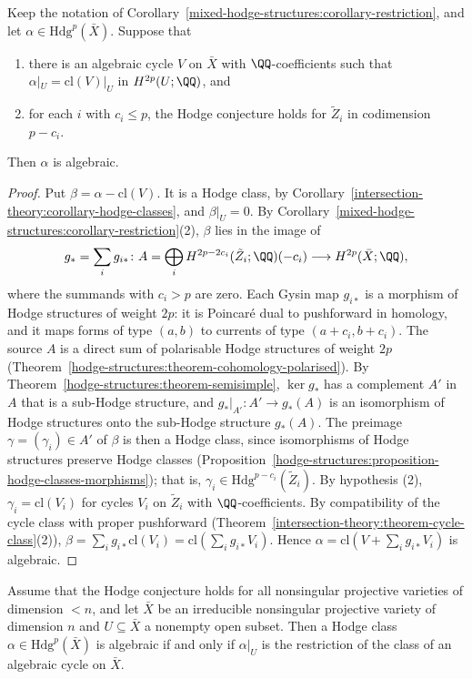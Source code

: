 \begin{proposition}\label{mixed-hodge-structures:proposition-localisation}
Keep the notation of Corollary~\ref{mixed-hodge-structures:corollary-restriction}, and let $\alpha \in \mathrm{Hdg}^p(\bar X)$. Suppose that
\begin{enumerate}
\item there is an algebraic cycle $V$ on $\bar X$ with $\QQ$-coefficients such that $\alpha|_U = \mathrm{cl}(V)|_U$ in $H^{2p}(U; \QQ)$, and
\item for each $i$ with $c_i \leq p$, the Hodge conjecture holds for $\tilde Z_i$ in codimension $p - c_i$.
\end{enumerate}
Then $\alpha$ is algebraic.
\end{proposition}

\begin{proof}
Put $\beta = \alpha - \mathrm{cl}(V)$. It is a Hodge class, by Corollary~\ref{intersection-theory:corollary-hodge-classes}, and $\beta|_U = 0$. By Corollary~\ref{mixed-hodge-structures:corollary-restriction}(2),
$\beta$ lies in the image of
\[
g_* = \sum_ig_{i*} \colon A = \bigoplus_iH^{2p-2c_i}(\tilde Z_i; \QQ)(-c_i) \longrightarrow H^{2p}(\bar X; \QQ),
\]
where the summands with $c_i > p$ are zero. Each Gysin map $g_{i*}$ is a morphism of Hodge structures of weight $2p$: it is Poincar\'e dual to pushforward in homology, and it maps forms of type $(a, b)$
to currents of type $(a + c_i, b + c_i)$. The source $A$ is a direct sum of polarisable Hodge structures of weight $2p$ (Theorem~\ref{hodge-structures:theorem-cohomology-polarised}). By
Theorem~\ref{hodge-structures:theorem-semisimple}, $\ker g_*$ has a complement $A'$ in $A$ that is a sub-Hodge structure, and $g_*|_{A'} \colon A' \to g_*(A)$ is an isomorphism of Hodge structures onto the
sub-Hodge structure $g_*(A)$. The preimage $\gamma = (\gamma_i) \in A'$ of $\beta$ is then a Hodge class, since isomorphisms of Hodge structures preserve Hodge classes
(Proposition~\ref{hodge-structures:proposition-hodge-classes-morphisms}); that is, $\gamma_i \in \mathrm{Hdg}^{p-c_i}(\tilde Z_i)$. By hypothesis (2), $\gamma_i = \mathrm{cl}(V_i)$ for cycles $V_i$ on $\tilde Z_i$
with $\QQ$-coefficients. By compatibility of the cycle class with proper pushforward (Theorem~\ref{intersection-theory:theorem-cycle-class}(2)), $\beta = \sum_ig_{i*}\mathrm{cl}(V_i) = \mathrm{cl}(\sum_ig_{i*}V_i)$.
Hence $\alpha = \mathrm{cl}(V + \sum_ig_{i*}V_i)$ is algebraic.
\end{proof}

\begin{corollary}\label{mixed-hodge-structures:corollary-localisation}
Assume that the Hodge conjecture holds for all nonsingular projective varieties of dimension $< n$, and let $\bar X$ be an irreducible nonsingular projective variety of dimension $n$ and
$U \subseteq \bar X$ a nonempty open subset. Then a Hodge class $\alpha \in \mathrm{Hdg}^p(\bar X)$ is algebraic if and only if $\alpha|_U$ is the restriction of the class of an algebraic cycle on $\bar X$.
\end{corollary}

